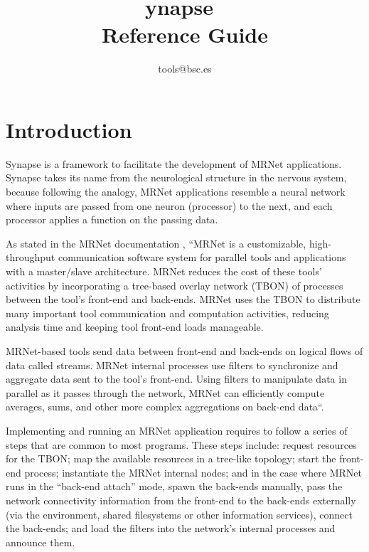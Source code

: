 \documentclass[twoside,a4,english,11pt]{book}
\newcommand{\SYNAPSE}{{\sf {S}ynapse}\ }
\begin{document}

\title {
  \SYNAPSE \\
  Reference Guide
}

\author {
  tools@bsc.es
}

\maketitle
\tableofcontents

\chapter{Introduction}

Synapse is a framework to facilitate the development of MRNet \cite{Roth03MRNet} applications. Synapse 
takes its name from the neurological structure in the nervous system, because following the analogy,
MRNet applications resemble a neural network where inputs are passed from one neuron (processor) to 
the next, and each processor applies a function on the passing data. 

As stated in the MRNet documentation \cite{MRNetUG}, ``MRNet is a customizable, high-throughput communication 
software system for parallel tools and applications with a master/slave architecture. MRNet reduces the cost 
of these tools' activities by incorporating a tree-based overlay network (TBON) of processes between the tool's 
front-end and back-ends. MRNet uses the TBON to distribute many important tool communication and computation 
activities, reducing analysis time and keeping tool front-end loads manageable.

MRNet-based tools send data between front-end and back-ends on logical flows of data called streams. MRNet internal 
processes use filters to synchronize and aggregate data sent to the tool's front-end. Using filters to manipulate 
data in parallel as it passes through the network, MRNet can efficiently compute averages, sums, and other more 
complex aggregations on back-end data``.

Implementing and running an MRNet application requires to follow a series of steps that are 
common to most programs. These steps include: request resources for the TBON; map the 
available resources in a tree-like topology; start the front-end process; instantiate the MRNet 
internal nodes; and in the case where MRNet runs in the ``back-end attach'' mode, spawn 
the back-ends manually, pass the network connectivity information from the front-end to the 
back-ends externally (via the environment, shared filesystems or other information services), 
connect the back-ends; and load the filters into the network's internal processes and announce them. 
\end{document}
